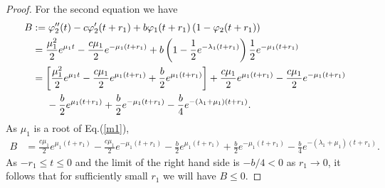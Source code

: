 \documentclass[12pt,letterpaper]{amsart}
\theoremstyle{definition}
\theoremstyle{remark}
\numberwithin{equation}{section}
\begin{document}
\begin{proof}
\medskip
For the second equation we have
\begin{align*}
B&:= \varphi_{2}^{\prime\prime}(t)-c\varphi_{2}^{\prime}(t+r_1)+b\varphi_{1}(t+r_1)\left(
1-\varphi_{2}(t+r_1)\right)  \\
&= \frac{\mu_1^2}{2}e^{\mu_1t}-\frac{c\mu_1}{2}e^{-\mu_1(t+r_1)}+b\left( 1-\frac{1}{2}e^{-\lambda_1(t+r_1)}\right) \frac{1}{2}e^{-\mu_1(t+r_1)}\\
&= \left[ \frac{\mu_1^2}{2}e^{\mu_1t} -\frac{c\mu_1}{2}e^{\mu_1(t+r_1)} +\frac{b}{2}e^{\mu_1(t+r_1)} \right] 
+\frac{c\mu_1}{2}e^{\mu_1(t+r_1)}  -\frac{c\mu_1}{2}e^{-\mu_1(t+r_1)} \\
&\hspace{0.5cm} - \frac{b}{2}e^{\mu_1(t+r_1)}  +\frac{b}{2}e^{-\mu_1(t+r_1)} -\frac{b}{4}e^{-(\lambda_1+\mu_1)(t+r_1)} .
\end{align*}
As $\mu_1$ is a root of Eq.(\ref{m1}), 
\begin{align*}
B&=
\frac{c\mu_1}{2}e^{\mu_1(t+r_1)}  -\frac{c\mu_1}{2}e^{-\mu_1(t+r_1)}  - \frac{b}{2}e^{\mu_1(t+r_1)}  +\frac{b}{2}e^{-\mu_1(t+r_1)} -\frac{b}{4}e^{-(\lambda_1+\mu_1)(t+r_1)} .
\end{align*}
As $-r_1\le t\le 0$ and the limit of the right hand side is $-b/4<0$ as $r_1\to 0$, it follows that for sufficiently small $r_1$ we will have  $B\le 0$.



\end{proof}
\end{document}
